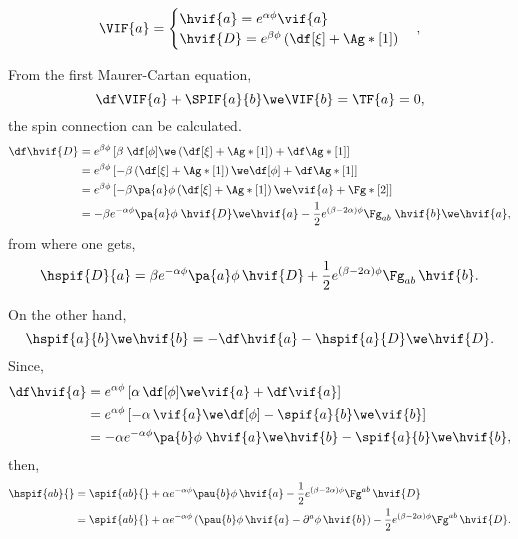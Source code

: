 \begin{equation}
  \VIF{a} = 
  \begin{cases}
    \hvif{a} = e^{\alpha\phi} \vif{a}\\
    \hvif{D} = e^{\beta\phi} \left( \df[\xi] + \Ag*[1] \right)
  \end{cases},
\end{equation}

From the first Maurer-Cartan equation,
\begin{equation}
  \df \VIF{a} + \SPIF{a}{b} \we \VIF{b} = \TF{a} = 0,
\end{equation}
the spin connection can be calculated.
\begin{align}
  \df\hvif{D}
  &= e^{\beta \phi} \left[ \beta \; \df[\phi] \we \left( \df[\xi] + \Ag*[1] \right) + \df\Ag*[1] \right] \nonumber\\
  &= e^{\beta \phi} \left[ -\beta \left( \df[\xi] + \Ag*[1] \right) \we \df[\phi] + \df \Ag*[1] \right] \nonumber\\
  &= e^{\beta \phi} \left[ -\beta \pa{a}\phi \left( \df[\xi] + \Ag*[1] \right) \we \vif{a} + \Fg*[2] \right] \nonumber\\
  &= - \beta e^{-\alpha \phi} \pa{a} \phi \; \hvif{D} \we \hvif{a} - \frac{1}{2} e^{(\beta - 2\alpha) \phi} \Fg_{a b} \; \hvif{b} \we \hvif{a},
\end{align}
from where one gets,
\begin{equation}
  \hspif{D}{a} = \beta e^{-\alpha \phi} \pa{a} \phi \, \hvif{D} + \frac{1}{2} e^{(\beta - 2\alpha) \phi} \Fg_{a b} \, \hvif{b}.
\end{equation}

On the other hand,
\begin{equation}
  \hspif{a}{b} \we \hvif{b} = - \df\hvif{a} - \hspif{a}{D} \we \hvif{D}.
\end{equation}
Since,
\begin{align}
  \df\hvif{a} 
  &= e^{\alpha \phi} \left[ \alpha \, \df[\phi] \we \vif{a} +  \df\vif{a} \right] \nonumber\\
  &= e^{\alpha \phi} \left[ -\alpha \, \vif{a} \we \df[\phi] -  \spif{a}{b} \we \vif{b} \right] \nonumber\\
  &= -\alpha e^{-\alpha \phi} \pa{b} \phi \; \hvif{a} \we \hvif{b} - \spif{a}{b} \we \hvif{b},
\end{align}
then,
\begin{align}
  \hspif{ab}{}
  &= \spif{ab}{} + \alpha e^{- \alpha \phi} \pau{b} \phi \, \hvif{a} - \frac{1}{2} e^{(\beta - 2\alpha) \phi} \Fg^{a b} \, \hvif{D} \nonumber\\
  &= \spif{ab}{} + \alpha e^{-\alpha \phi} \left( \pau{b} \phi \, \hvif{a} - \partial^{a} \phi \, \hvif{b} \right) - \frac{1}{2} e^{(\beta - 2\alpha) \phi} \Fg^{a b} \, \hvif{D}.
\end{align}

